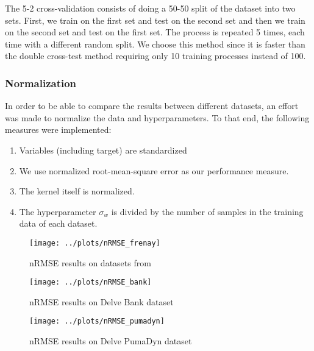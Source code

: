 The 5-2 cross-validation
consists of doing a 50-50 split of the dataset into two sets. First, we train on the first set and test on the second set
and then we train on the second set and test on the first set. The process is repeated 5 times, each time
with a different random split. We choose this method since it is faster than the double cross-test method
requiring only 10 training processes instead of 100.


\subsubsection{Normalization}

In order to be able to compare the results between different datasets, an effort
was made to normalize the data and hyperparameters. To that end, the
following measures were implemented:

\begin{enumerate}
    \item Variables (including target) are standardized
    \item We use normalized root-mean-square error as our performance
        measure.
    \item The kernel itself is normalized.
    \item The hyperparameter $\sigma_w$ is divided by the number of samples in
        the training data of each dataset.
\end{enumerate}



\begin{figure}
    \texttt{[image: ../plots/nRMSE\_frenay]}
    \caption{nRMSE results on datasets from \cite{frenayParameterinsensitiveKernelExtreme2011}}
\end{figure}

\begin{figure}
    \texttt{[image: ../plots/nRMSE\_bank]}
    \caption{nRMSE results on Delve Bank dataset}
\end{figure}

\begin{figure}
    \texttt{[image: ../plots/nRMSE\_pumadyn]}
    \caption{nRMSE results on Delve PumaDyn dataset}
\end{figure}
